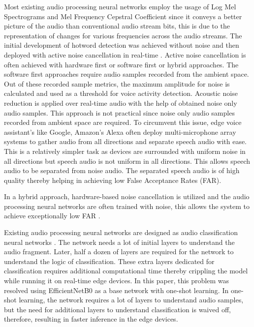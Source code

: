 \documentclass[10pt,twocolumn]{article}
\begin{document}
Most existing audio processing neural networks employ the usage of Log Mel Spectrograms \cite{Atsavasirilert_2019} and Mel Frequency Cepstral Coefficient \cite{Atsavasirilert_2019} since it conveys a better picture of the audio than conventional audio stream bits, this is due to the representation of changes for various frequencies across the audio streams. The initial development of hotword detection was achieved without noise \cite{Huang_2019} and then deployed with active noise cancellation in real-time \cite{Huang_Yiteng_Wan_Li_2019}. Active noise cancellation is often achieved with hardware first or software first or hybrid approaches. The software first approaches require audio samples recorded from the ambient space. Out of these recorded sample metrics, the maximum amplitude for noise is calculated and used as a threshold for voice activity detection. Acoustic noise reduction is applied over real-time audio with the help of obtained noise only audio samples. This approach is not practical since noise only audio samples recorded from ambient space are required. To circumvent this issue, edge voice assistant’s like Google, Amazon’s Alexa often deploy multi-microphone array systems \cite{Huang_Yiteng_Wan_Li_2019} to gather audio from all directions and separate speech audio with ease. This is a relatively simpler task as devices are surrounded with uniform noise in all directions but speech audio is not uniform in all directions. This allows speech audio to be separated from noise audio. The separated speech audio is of high quality thereby helping in achieving low False Acceptance Rates (FAR).

In a hybrid approach, hardware-based noise cancellation is utilized and the audio processing neural networks are often trained with noise, this allows the system to achieve exceptionally low FAR \cite{Huang_Yiteng_Wan_Li_2019}.

Existing audio processing neural networks are designed as audio classification neural networks \cite{Hershey_2017}. The network needs a lot of initial layers to understand the audio fragment. Later, half a dozen of layers are required for the network to understand the logic of classification. These extra layers dedicated for classification requires additional computational time thereby crippling the model while running it on real-time edge devices. In this paper, this problem was resolved using EfficientNetB0 as a base network with one-shot learning. In one-shot learning, the network requires a lot of layers to understand audio samples, but the need for additional layers to understand classification is waived off, therefore, resulting in faster inference in the edge devices.
\end{document}
